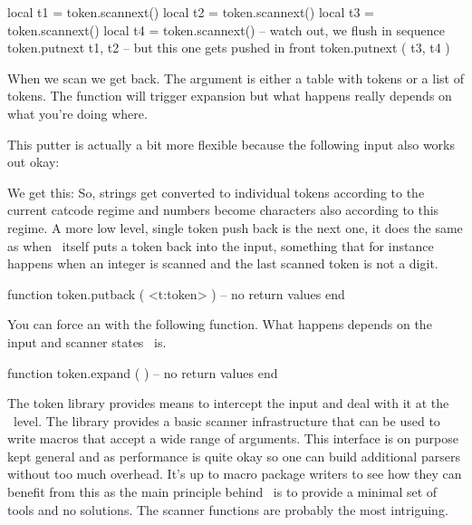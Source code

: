 \starttyping
local t1 = token.scannext()
local t2 = token.scannext()
local t3 = token.scannext()
local t4 = token.scannext()
-- watch out, we flush in sequence
token.putnext { t1, t2 }
-- but this one gets pushed in front
token.putnext ( t3, t4 )
\stoptyping

When we scan  we get  back. The argument is either a
table with tokens or a list of tokens. The  function will
trigger expansion but what happens really depends on what you're doing where.

This putter is actually a bit more flexible because the following input also
works out okay:

\startbuffer
\def\foo#1{[#1]}

\stopbuffer

\typebuffer

We get this: \blank {\tt \inlinebuffer} \blank So, strings get converted to
individual tokens according to the current catcode regime and numbers become
characters also according to this regime. A more low level, single token push
back is the next one, it does the same as when \TEX\ itself puts a token back into
the input, something that for instance happens when an integer is scanned and the
last scanned token is not a digit.

\starttyping[option=LUA]
function token.putback ( <t:token> )
    -- no return values
end
\stoptyping

You can force an  with the following function. What happens
depends on the input and scanner states \TEX\ is.

\starttyping[option=LUA]
function token.expand ( )
    -- no return values
end
\stoptyping

\stopsubsection

\startsubsection[title={Scanning}]

The token library provides means to intercept the input and deal with it at the
\LUA\ level. The library provides a basic scanner infrastructure that can be used
to write macros that accept a wide range of arguments. This interface is on
purpose kept general and as performance is quite okay so one can build additional
parsers without too much overhead. It's up to macro package writers to see how
they can benefit from this as the main principle behind \LUAMETATEX\ is to
provide a minimal set of tools and no solutions. The scanner functions are
probably the most intriguing.

